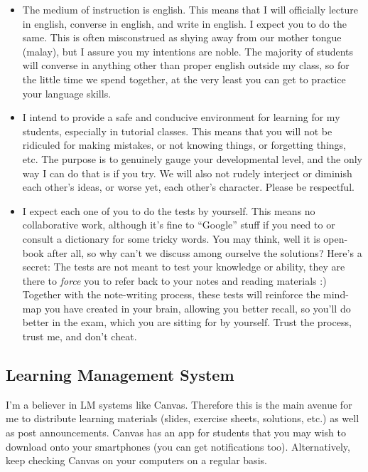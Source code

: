 \documentclass[
]{book}
\theoremstyle{definition}
\theoremstyle{definition}
\theoremstyle{definition}
\theoremstyle{definition}
\theoremstyle{remark}
\begin{document}
\begin{itemize}
\item
  The medium of instruction is english. This means that I will officially lecture in english, converse in english, and write in english. I expect you to do the same. This is often misconstrued as shying away from our mother tongue (malay), but I assure you my intentions are noble. The majority of students will converse in anything other than proper english outside my class, so for the little time we spend together, at the very least you can get to practice your language skills.
\item
  I intend to provide a safe and conducive environment for learning for my students, especially in tutorial classes. This means that you will not be ridiculed for making mistakes, or not knowing things, or forgetting things, etc. The purpose is to genuinely gauge your developmental level, and the only way I can do that is if you try. We will also not rudely interject or diminish each other's ideas, or worse yet, each other's character. Please be respectful.
\item
  I expect each one of you to do the tests by yourself. This means no collaborative work, although it's fine to ``Google'' stuff if you need to or consult a dictionary for some tricky words. You may think, well it is open-book after all, so why can't we discuss among ourselve the solutions? Here's a secret: The tests are not meant to test your knowledge or ability, they are there to \emph{force} you to refer back to your notes and reading materials :) Together with the note-writing process, these tests will reinforce the mind-map you have created in your brain, allowing you better recall, so you'll do better in the exam, which you are sitting for by yourself. Trust the process, trust me, and don't cheat.
\end{itemize}

\hypertarget{learning-management-system}{%
\subsection*{Learning Management System}\label{learning-management-system}}

I'm a believer in LM systems like Canvas. Therefore this is the main avenue for me to distribute learning materials (slides, exercise sheets, solutions, etc.) as well as post announcements.
Canvas has an app for students that you may wish to download onto your smartphones (you can get notifications too).
Alternatively, keep checking Canvas on your computers on a regular basis.
\end{document}
